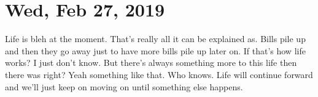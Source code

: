 \section{Wed, Feb 27, 2019}

Life is bleh at the moment. That's really all it can be explained as. Bills pile 
up and then they go away just to have more bills pile up later on. If that's how 
life works? I just don't know. But there's always something more to this life 
then there was right? Yeah something like that. Who knows. Life will continue 
forward and we'll just keep on moving on until something else happens.
